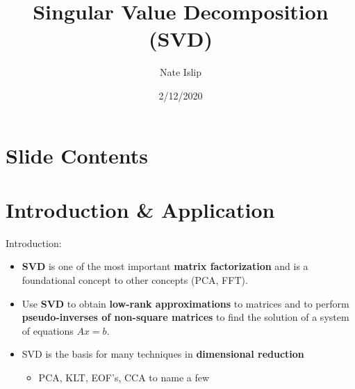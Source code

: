 \documentclass[9pt]{beamer}
\title[MATH 545]{Singular Value Decomposition (SVD)}
\author{Nate Islip}
\institute{Eastern Washington University}
\date{2/12/2020}
\begin{document}
\section{Slide Contents}

    

\section{Introduction \& Application}

\begin{frame}{Introduction:}
    \begin{itemize}
        \item \textbf{SVD} is one of the most important \textbf{matrix factorization} and is a foundational concept to other concepts (PCA, FFT).
        \item Use \textbf{SVD} to obtain \textbf{low-rank approximations} to matrices and to perform \textbf{pseudo-inverses of non-square matrices} to find the solution of a system of equations $Ax = b$. 
        \item SVD is the basis for many techniques in \textbf{dimensional reduction}
        \begin{itemize}
            \item PCA, KLT, EOF's, CCA to name a few
        \end{itemize}
    \end{itemize}
\end{frame}
\end{document}
